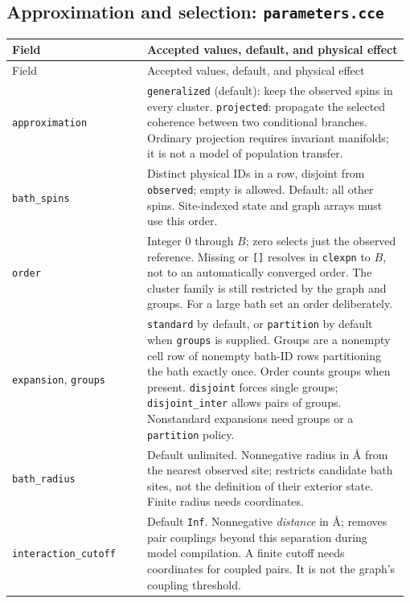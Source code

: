 \documentclass[11pt,a4paper]{article}
\newcommand{\code}[1]{\texttt{#1}}
\begin{document}
\subsection{Approximation and selection: \code{parameters.cce}}
\begingroup\small
\begin{longtable}{@{}>{\raggedright\arraybackslash}p{0.335\linewidth}@{\hspace{0.025\linewidth}}>{\raggedright\arraybackslash}p{0.64\linewidth}@{}}
\toprule
Field & Accepted values, default, and physical effect\\
\midrule\endfirsthead
\toprule
Field & Accepted values, default, and physical effect\\
\midrule\endhead
\midrule\endfoot
\bottomrule\endlastfoot
\code{approximation} & \code{generalized} (default): keep the observed spins in every cluster. \code{projected}: propagate the selected coherence between two conditional branches. Ordinary projection requires invariant manifolds; it is not a model of population transfer.\\
\code{bath\_spins} & Distinct physical IDs in a row, disjoint from \code{observed}; empty is allowed. Default: all other spins. Site-indexed state and graph arrays must use this order.\\
\code{order} & Integer 0 through $B$; zero selects just the observed reference. Missing or \code{[]} resolves in \code{clexpn} to $B$, not to an automatically converged order. The cluster family is still restricted by the graph and groups. For a large bath set an order deliberately.\\
\code{expansion}, \code{groups} & \code{standard} by default, or \code{partition} by default when \code{groups} is supplied. Groups are a nonempty cell row of nonempty bath-ID rows partitioning the bath exactly once. Order counts groups when present. \code{disjoint} forces single groups; \code{disjoint\_inter} allows pairs of groups. Nonstandard expansions need groups or a \code{partition} policy.\\
\code{bath\_radius} & Default unlimited. Nonnegative radius in \AA{} from the nearest observed site; restricts candidate bath sites, not the definition of their exterior state. Finite radius needs coordinates.\\
\code{interaction\_cutoff} & Default \code{Inf}. Nonnegative \emph{distance} in \AA{}; removes pair couplings beyond this separation during model compilation. A finite cutoff needs coordinates for coupled pairs. It is not the graph's coupling threshold.\\

\end{longtable}
\end{document}
